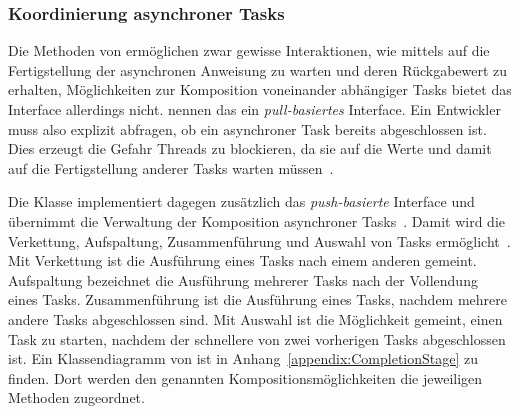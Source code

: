 \subsubsection{Koordinierung asynchroner Tasks}\label{sec:CompletableFuture}
Die Methoden von  ermöglichen zwar gewisse Interaktionen, wie mittels  auf die Fertigstellung der asynchronen \gls{Anweisung} zu warten und deren Rückgabewert zu erhalten, Möglichkeiten zur Komposition voneinander abhängiger Tasks bietet das Interface allerdings nicht. \textcite[S.~240]{Hettel2016} nennen das ein \emph{pull-basiertes} Interface. Ein Entwickler muss also explizit abfragen, ob ein asynchroner Task bereits abgeschlossen ist. Dies erzeugt die Gefahr Threads zu blockieren, da sie auf die Werte und damit auf die Fertigstellung anderer Tasks warten müssen~\cite[S.~239]{Hettel2016}.

Die Klasse  implementiert dagegen zusätzlich das \emph{push-basierte} Interface \classCompletionStage{} und übernimmt die Verwaltung der Komposition asynchroner Tasks~\cite[S.~240~\psqq]{Hettel2016}. Damit wird die Verkettung, Aufspaltung, Zusammenführung und Auswahl von Tasks ermöglicht~\cite[S.~250~\psqq]{Hettel2016}. Mit Verkettung ist die Ausführung eines Tasks nach einem anderen gemeint. Aufspaltung bezeichnet die Ausführung mehrerer Tasks nach der Vollendung eines Tasks. Zusammenführung ist die Ausführung eines Tasks, nachdem mehrere andere Tasks abgeschlossen sind. Mit Auswahl ist die Möglichkeit gemeint, einen Task zu starten, nachdem der schnellere von zwei vorherigen Tasks abgeschlossen ist. Ein Klassendiagramm von \classCompletionStage{} ist in Anhang~\vref{appendix:CompletionStage} zu finden. Dort werden den genannten Kompositionsmöglichkeiten die jeweiligen Methoden zugeordnet.